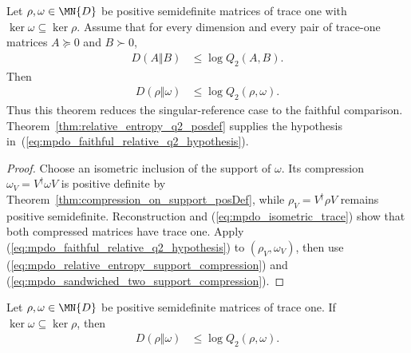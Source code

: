 \begin{theorem}
    \label{thm:relative_entropy_q2_faithful_reduction}
    \leanok
    Let $\rho,\omega\in\MN{D}$ be positive semidefinite matrices of trace one
    with $\ker\omega\subseteq\ker\rho$. Assume that for every dimension and
    every pair of trace-one matrices $A\succeq0$ and $B\succ0$,
    \begin{align}
        D(A\Vert B) & \leq\log Q_2(A,B).
        \label{eq:mpdo_faithful_relative_q2_hypothesis}
    \end{align}
    Then
    \begin{align}
        D(\rho\Vert\omega) & \leq\log Q_2(\rho,\omega).
        \label{eq:mpdo_singular_relative_q2_comparison}
    \end{align}
    Thus this theorem reduces the singular-reference case to the faithful
    comparison. Theorem~\ref{thm:relative_entropy_q2_posdef} supplies the
    hypothesis in~(\ref{eq:mpdo_faithful_relative_q2_hypothesis}).
\end{theorem}

\begin{proof}\leanok
    Choose an isometric inclusion of the support of $\omega$. Its compression
    $\omega_V=V^\dagger\omega V$ is positive definite by
    Theorem~\ref{thm:compression_on_support_posDef}, while
    $\rho_V=V^\dagger\rho V$ remains positive semidefinite. Reconstruction
    and (\ref{eq:mpdo_isometric_trace}) show that both compressed matrices
    have trace one. Apply (\ref{eq:mpdo_faithful_relative_q2_hypothesis}) to
    $(\rho_V,\omega_V)$, then use
    (\ref{eq:mpdo_relative_entropy_support_compression}) and
    (\ref{eq:mpdo_sandwiched_two_support_compression}).
\end{proof}

\begin{theorem}
    \label{thm:relative_entropy_q2_support}
    \leanok
    Let $\rho,\omega\in\MN{D}$ be positive semidefinite matrices of trace one.
    If $\ker\omega\subseteq\ker\rho$, then
    \begin{align}
        D(\rho\Vert\omega) & \leq\log Q_2(\rho,\omega).
        \label{eq:mpdo_relative_q2_support}
    \end{align}
\end{theorem}

